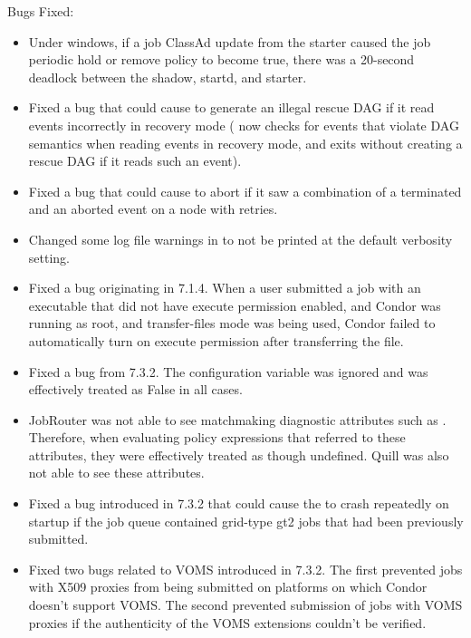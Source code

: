 \noindent Bugs Fixed:

\begin{itemize}

\item Under windows, if a job ClassAd update from the starter caused the
job periodic hold or remove policy to become true, there was a 20-second
deadlock between the shadow, startd, and starter.

\item Fixed a bug that could cause  to generate an
illegal rescue DAG if it read events incorrectly in recovery mode
( now checks for events that violate DAG semantics
when reading events in recovery mode, and exits without creating a
rescue DAG if it reads such an event).

\item Fixed a bug that could cause  to abort if it saw
a combination of a terminated and an aborted event on a node with
retries.

\item Changed some log file warnings in  to not be
printed at the default verbosity setting.

\item Fixed a bug originating in 7.1.4.  When a user submitted a job
with an executable that did not have execute permission enabled, and
Condor was running as root, and transfer-files mode was being used,
Condor failed to automatically turn on execute permission after
transferring the file.

\item Fixed a bug from 7.3.2.  The configuration variable
 was ignored and was effectively
treated as False in all cases.

\item JobRouter was not able to see matchmaking diagnostic attributes
such as .  Therefore, when evaluating policy
expressions that referred to these attributes, they were effectively
treated as though undefined.  Quill was also not able to see these
attributes.

\item Fixed a bug introduced in 7.3.2 that could cause the
 to crash repeatedly on startup if the job queue
contained grid-type gt2 jobs that had been previously submitted.

\item Fixed two bugs related to VOMS introduced in 7.3.2. The first
prevented jobs with X509 proxies from being submitted on platforms
on which Condor doesn't support VOMS. The second prevented submission
of jobs with VOMS proxies if the authenticity of the VOMS extensions
couldn't be verified.


\end{itemize}
